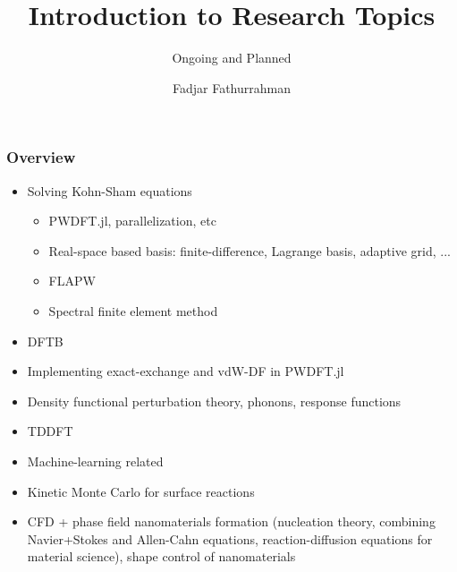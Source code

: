 \documentclass[english,9pt]{beamer}
\begin{document}
\title{Introduction to Research Topics}
\subtitle{Ongoing and Planned}
\author{Fadjar Fathurrahman}
\date{}


\frame{\titlepage}


\begin{frame}
\frametitle{Overview}

\begin{itemize}
\item Solving Kohn-Sham equations
  \begin{itemize}
  \item PWDFT.jl, parallelization, etc
  \item Real-space based basis: finite-difference, Lagrange basis, adaptive grid, ...
  \item FLAPW
  \item Spectral finite element method
  \end{itemize}
\item DFTB
\item Implementing exact-exchange and vdW-DF in PWDFT.jl
\item Density functional perturbation theory, phonons, response functions
\item TDDFT
\item Machine-learning related
\item Kinetic Monte Carlo for surface reactions
\item CFD + phase field nanomaterials formation (nucleation theory, combining Navier+Stokes and Allen-Cahn equations, reaction-diffusion equations for material science), shape control of nanomaterials
\end{itemize}

\end{frame}
\end{document}

